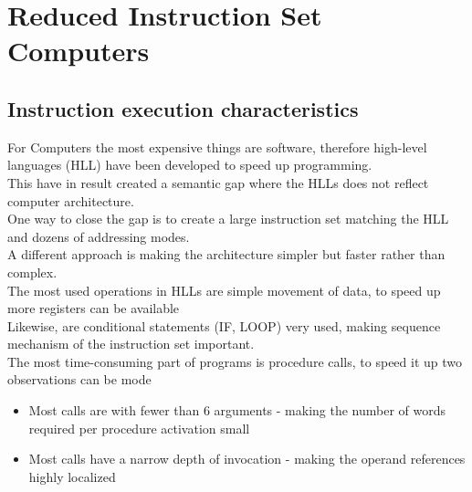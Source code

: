 \documentclass[12pt, a4paper]{article}
\begin{document}
	\section{Reduced Instruction Set Computers}
		\subsection{Instruction execution characteristics}
			For Computers the most expensive things are software, therefore high-level languages (HLL) have been developed to speed up programming.\\
			This have in result created a semantic gap where the HLLs does not reflect computer architecture.\\
			One way to close the gap is to create a large instruction set matching the HLL and dozens of addressing modes.\\
			A different approach is making the architecture simpler but faster rather than complex.\\
			The most used operations in HLLs are simple movement of data, to speed up more registers can be available\\
			Likewise, are conditional statements (IF, LOOP) very used, making sequence mechanism of the instruction set important.\\
			The most time-consuming part of programs is procedure calls, to speed it up two observations can be mode
			\begin{itemize}
				\item Most calls are with fewer than 6 arguments - making the number of words required per procedure activation small
				\item Most calls have a narrow depth of invocation - making the operand references highly localized
			\end{itemize}
\end{document}

